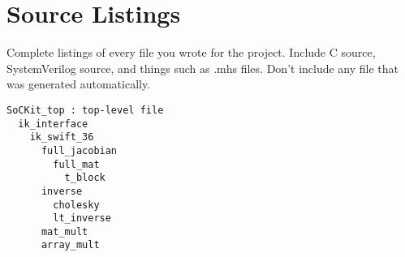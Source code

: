 \section{Source Listings}
Complete listings of every file you wrote for the project. Include C source, SystemVerilog source, and things such as .mhs files. Don't include any file that was generated automatically.

\begin{verbatim}
SoCKit_top : top-level file
  ik_interface
    ik_swift_36
      full_jacobian
        full_mat
          t_block
      inverse
        cholesky
        lt_inverse
      mat_mult
      array_mult
\end{verbatim}
